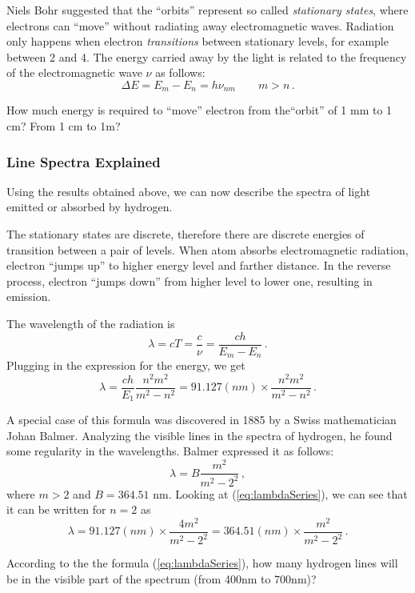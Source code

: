 Niels Bohr suggested that the ``orbits'' represent so called
\emph{stationary states}, where electrons can ``move'' without
radiating away electromagnetic waves. Radiation only happens when
electron \emph{transitions} between stationary levels, for example
between 2 and 4. The energy carried away by the light is related to
the frequency of the electromagnetic wave $\nu$ as follows:
\[
\Delta E = E_m - E_n = h\nu_{nm}\qquad m > n\,.
\]

\begin{exercise}
	How much energy is required to ``move'' electron from the``orbit''
	of 1 mm to 1 cm? From 1 cm to 1m?
\end{exercise}

\subsubsection{Line Spectra Explained}
Using the results obtained above, we can now describe the spectra of
light emitted or absorbed by hydrogen.

The stationary states are discrete, therefore there are discrete
energies of transition between a pair of levels. When atom absorbs
electromagnetic radiation, electron ``jumps up'' to higher energy
level and farther distance. In the reverse process, electron ``jumps
down'' from higher level to lower one, resulting in emission.

The wavelength of the radiation is
\[
\lambda = cT = \frac{c}{\nu} = \frac{ch}{E_m - E_n}\,.
\]
Plugging in the expression for the energy, we get
\begin{equation}
	\lambda = \frac{ch}{E_1}\frac{n^2m^2}{m^2-n^2} = 91.127(nm)\times\frac{n^2m^2}{m^2-n^2}\,.
	\label{eq:lambdaSeries}
\end{equation}

A special case of this formula was discovered in 1885 by a Swiss
mathematician Johan Balmer. Analyzing the visible lines in the spectra
of hydrogen, he found some regularity in the wavelengths. Balmer
expressed it as follows:
\[
\lambda = B\frac{m^2}{m^2-2^2}\,,
\]
where $m > 2$ and $B=364.51$ nm.
Looking at (\ref{eq:lambdaSeries}), we can see that it can be written
for $n=2$ as
\[
\lambda = 91.127(nm)\times \frac{4m^2}{m^2-2^2} = 364.51(nm)\times \frac{m^2}{m^2-2^2}\,.
\]

\begin{exercise}
	According to the the formula  (\ref{eq:lambdaSeries}), how many
	hydrogen lines will be in the visible part of the spectrum (from
	400nm to 700nm)?
\end{exercise}

